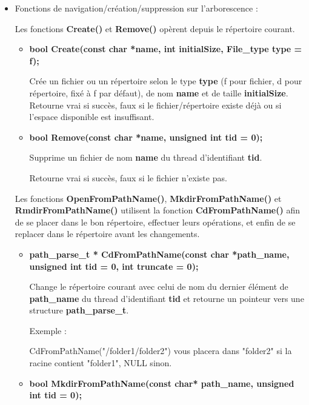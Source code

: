 \documentclass{article}
\begin{document}
\begin{itemize}

\item
Fonctions de navigation/création/suppression sur l'arborescence :

Les fonctions \textbf{Create()} et \textbf{Remove()} opèrent depuis le répertoire courant.

\begin{itemize}

  \item
  \textbf{bool Create(const char *name, int initialSize, File\_type type = f);}

  Crée un fichier ou un répertoire selon le type \textbf{type} (f pour fichier, d pour répertoire, fixé à f par défaut), de nom \textbf{name} et de taille \textbf{initialSize}.
  Retourne vrai si succès, faux si le fichier/répertoire existe déjà ou si l'espace disponible est insuffisant.

    \item
    \textbf{ bool Remove(const char *name, unsigned int tid = 0);}

    Supprime un fichier de nom \textbf{name} du thread d'identifiant \textbf{tid}.

    Retourne vrai si succès, faux si le fichier n'existe pas.

\end{itemize}

Les fonctions \textbf{OpenFromPathName()},  \textbf{MkdirFromPathName()} et  \textbf{RmdirFromPathName()} utilisent la fonction  \textbf{CdFromPathName()} afin de se placer dans le bon répertoire, effectuer leurs opérations, et enfin de se replacer dans le répertoire avant les changements.

     \begin{itemize}

     \item
      \textbf{path\_parse\_t * CdFromPathName(const char *path\_name, unsigned int tid = 0, int truncate = 0);}

     Change le répertoire courant avec celui de nom du dernier élément de \textbf{path\_name} du thread d'identifiant \textbf{tid} et retourne un pointeur vers une structure  \textbf{path\_parse\_t}.

     Exemple :

     CdFromPathName("/folder1/folder2") vous placera dans "folder2" si la racine contient "folder1", NULL sinon.

     \item
     \textbf{bool MkdirFromPathName(const char* path\_name, unsigned int tid = 0);}


\end{itemize}
\end{itemize}
\end{document}
